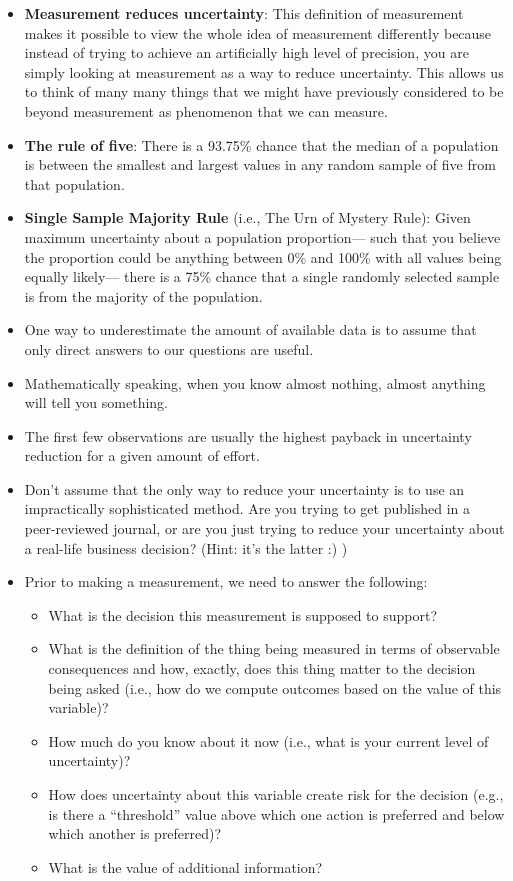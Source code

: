 \begin{itemize}
\item \textbf{Measurement reduces uncertainty}: This definition of measurement makes it possible to view the whole idea of measurement differently because instead of trying to achieve an artificially high level of precision, you are simply looking at measurement as a way to reduce uncertainty. This allows us to think of many many things that we might have previously considered to be beyond measurement as phenomenon that we can measure.
\item \textbf{The rule of five}: There is a 93.75\% chance that the median of a population is between the smallest and largest values in any random sample of five from that population.
\item \textbf{Single Sample Majority Rule} (i.e., The Urn of Mystery Rule): Given maximum uncertainty about a population proportion— such that you believe the proportion could be anything between 0\% and 100\% with all values being equally likely— there is a 75\% chance that a single randomly selected sample is from the majority of the population.
\item One way to underestimate the amount of available data is to assume that only direct answers to our questions are useful.
\item Mathematically speaking, when you know almost nothing, almost anything will tell you something.
\item The first few observations are usually the highest payback in uncertainty reduction for a given amount of effort.
\item Don’t assume that the only way to reduce your uncertainty is to use an impractically sophisticated method. Are you trying to get published in a peer-reviewed journal, or are you just trying to reduce your uncertainty about a real-life business decision? (Hint: it’s the latter :) )
\item Prior to making a measurement, we need to answer the following:


\begin{itemize}
\item What is the decision this measurement is supposed to support?
\item What is the definition of the thing being measured in terms of observable consequences and how, exactly, does this thing matter to the decision being asked (i.e., how do we compute outcomes based on the value of this variable)?
\item How much do you know about it now (i.e., what is your current level of uncertainty)?
\item How does uncertainty about this variable create risk for the decision (e.g., is there a “threshold” value above which one action is preferred and below which another is preferred)?
\item What is the value of additional information?
\end{itemize}
\end{itemize}

